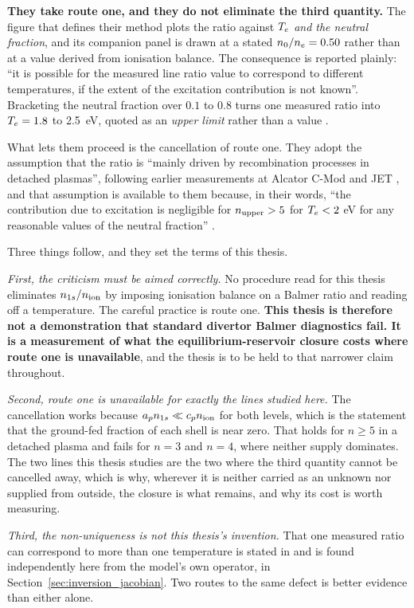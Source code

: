 \textbf{They take route one, and they do not eliminate the third quantity.} The
figure that defines their method plots the ratio against $T_e$ \emph{and the
neutral fraction}, and its companion panel is drawn at a stated
$n_0/n_e = 0.50$ rather than at a value derived from ionisation balance. The
consequence is reported plainly: ``it is possible for the measured line ratio
value to correspond to different temperatures, if the extent of the excitation
contribution is not known''. Bracketing the neutral fraction over $0.1$ to $0.8$
turns one measured ratio into $T_e = 1.8$ to \SI{2.5}{\electronvolt}, quoted as
an \emph{upper limit} rather than a value \cite[Sec.~3.2]{Lomanowski2015}.

What lets them proceed is the cancellation of route one. They adopt the
assumption that the ratio is ``mainly driven by recombination processes in
detached plasmas'', following earlier measurements at Alcator C-Mod and JET
\cite{Lumma1997, McCracken1998}, and that assumption is available to them
because, in their words, ``the contribution due to excitation is negligible for
$n_{\rm upper} > 5$ for $T_e < 2$ eV for any reasonable values of the neutral
fraction'' \cite[Sec.~3.2]{Lomanowski2015}.

Three things follow, and they set the terms of this thesis.

\emph{First, the criticism must be aimed correctly.} No procedure read for this
thesis eliminates $n_{1s}/n_{\mathrm{ion}}$ by imposing ionisation balance on a Balmer ratio
and reading off a temperature. The careful practice is route one. \textbf{This
thesis is therefore not a demonstration that standard divertor Balmer
diagnostics fail. It is a measurement of what the equilibrium-reservoir closure
costs where route one is unavailable}, and the thesis is to be held to that
narrower claim throughout.

\emph{Second, route one is unavailable for exactly the lines studied here.} The
cancellation works because $a_pn_{1s} \ll c_pn_{\mathrm{ion}}$ for both levels, which is the
statement that the ground-fed fraction of each shell is near zero. That holds
for $n \geq 5$ in a detached plasma and fails for $n=3$ and $n=4$, where neither
supply dominates. The two lines this thesis studies are the two where the third
quantity cannot be cancelled away, which is why, wherever it is neither carried as
an unknown nor supplied from outside, the closure is what remains, and why its cost is worth measuring.

\emph{Third, the non-uniqueness is not this thesis's invention.} That one
measured ratio can correspond to more than one temperature is stated in
\cite{Lomanowski2015} and is found independently here from the model's own
operator, in Section~\ref{sec:inversion_jacobian}. Two routes to the same defect is
better evidence than either alone.

